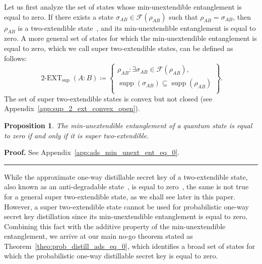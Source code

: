 \documentclass[twocolumn,letterpaper, dvipsnames,allowtoday, accepted = 2025-12-31]{quantumarticle}
\newtheorem{proposition}{Proposition}
\newenvironment{proof}[1][Proof]{\noindent\textbf{#1.} }{\ \rule{0.5em}{0.5em}}
\begin{document}
Let us first analyze the set of states whose min-unextendible entanglement is equal to zero. If there exists a state $\sigma_{AB} \in \mathcal{F}\!\left(\rho_{AB}\right)$ such that $\rho_{AB} = \sigma_{AB}$,
then $\rho_{AB}$ is a two-extendible state~\cite{Wer89, DPS02, DPS04}, and its min-unextendible entanglement is equal to zero. A more general set of states for which the min-unextendible entanglement is equal to zero, which we call super two-extendible states, can be defined as follows: 
\begin{equation}
    \operatorname{2-EXT}_{\operatorname{sup}}\!\left(A\!:\!B\right) \coloneqq  \left\{\begin{array}{c}
         \rho_{AB}:  
         
         \exists \sigma_{AB}\in \mathcal{F}\!\left(\rho_{AB}\right),\\
         \operatorname{supp}\!\left(\sigma_{AB}\right) \subseteq \operatorname{supp}\!\left(\rho_{AB}\right)\\
         
    \end{array}\right\}.
\end{equation}
The set of super two-extendible states is convex but not closed (see Appendix~\ref{app:sup_2_ext_convex_open}).



\begin{proposition}\label{prop:ads_min_unext_ent_eq_0}
    The min-unextendible entanglement of a quantum state is equal to zero if and only if it is super two-extendible. 
\end{proposition}
\begin{proof}
    See Appendix~\ref{app:ads_min_unext_ent_eq_0}.
\end{proof}

\medskip

While the approximate one-way distillable secret key of a two-extendible state, also known as an anti-degradable state~\cite{LDS18}, is equal to zero~\cite[Thm.~15.43]{KW24}, the same is not true for a general super two-extendible state, as we shall see later in this paper. However, 
a super two-extendible state cannot be used for probabilistic one-way secret key distillation since its min-unextendible entanglement is equal to zero. Combining this fact with the additive property of the min-unextendible entanglement, we arrive at our main no-go theorem stated as Theorem~\ref{theo:prob_distill_ads_eq_0}, which identifies a broad set of states for which the probabilistic one-way distillable secret key is equal to zero.
\end{document}
